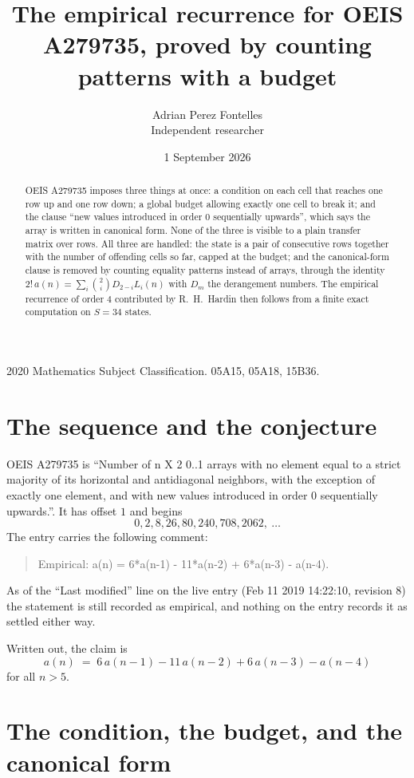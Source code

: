 \documentclass[11pt,a4paper]{article}
\title{The empirical recurrence for OEIS A279735, proved by counting patterns with a budget}
\author{Adrian Perez Fontelles\\ \small Independent researcher}
\date{1 September 2026}
\theoremstyle{plain}
\theoremstyle{definition}
\begin{document}
\maketitle

\begin{abstract}
OEIS A279735 imposes three things at once: a condition on each cell that reaches one row up and
one row down; a global budget allowing exactly one cell to
break it; and the clause ``new values introduced in order $0$ sequentially upwards'', which
says the array is written in canonical form. None of the three is visible to a plain transfer
matrix over rows. All three are handled: the state is a pair of consecutive rows
together with the number of offending cells so far, capped at the budget; and the
canonical-form clause is removed by counting equality patterns instead of arrays, through the
identity $2!\,a(n)=\sum_i\binom{2}{i}D_{2-i}L_i(n)$ with $D_m$ the derangement
numbers. The empirical recurrence of order $4$ contributed by R.~H.~Hardin then follows
from a finite exact computation on $S=34$ states.
\end{abstract}

\noindent\small 2020 Mathematics Subject Classification. 05A15, 05A18, 15B36.\normalsize

\section{The sequence and the conjecture}

OEIS A279735 is ``Number of n X 2 0..1 arrays with no element equal to a strict majority of its horizontal and antidiagonal neighbors, with the exception of exactly one element, and with new values introduced in order 0 sequentially upwards.''. It has offset $1$ and begins
\[
0, 2, 8, 26, 80, 240, 708, 2062,\ \dots
\]
The entry carries the following comment:
\begin{quote}\small
Empirical: a(n) = 6*a(n-1) - 11*a(n-2) + 6*a(n-3) - a(n-4).
\end{quote}
As of the ``Last modified'' line on the live entry (Feb 11 2019 14:22:10, revision 8) the statement is
still recorded as empirical, and nothing on the entry records it as settled either way.

Written out, the claim is
\begin{equation}\label{eq:conj}
a(n)\;=\;6\,a(n-1) - 11\,a(n-2) + 6\,a(n-3) - a(n-4)
\end{equation}
for all $n>5$.

\section{The condition, the budget, and the canonical form}
\end{document}
